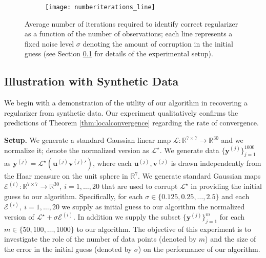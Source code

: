 \documentclass[11pt,letterpaper]{article}
\newcommand{\R}{\mathbb{R}}
\newcommand{\by}{\mathbf{y}}
\newcommand{\bu}{\mathbf{u}}
\newcommand{\bv}{\mathbf{v}}
\renewcommand{\L}{\mathcal{L}}
\begin{document}
\begin{figure}
	\centering
	\begin{subfigure}{.5\textwidth}
		\centering
		\texttt{[image: numberiterations\_line]}
		\label{fig:numberiterations_graph}
	\end{subfigure}
	\caption{Average number of iterations required to identify correct regularizer as a function of the number of observations; each line represents a fixed noise level $\sigma$ denoting the amount of corruption in the initial guess (see Section \ref{sec:numexp_synthetic} for details of the experimental setup).}
	\label{fig:numberiterations}
\end{figure}

\subsection{Illustration with Synthetic Data} \label{sec:numexp_synthetic}
We begin with a demonstration of the utility of our algorithm in recovering a regularizer from synthetic data.  Our experiment qualitatively confirms the predictions of Theorem \ref{thm:localconvergence} regarding the rate of convergence.

\textbf{Setup.} We generate a standard Gaussian linear map $\L : \R^{7 \times 7} \rightarrow \R^{30}$ and we normalize it; denote the normalized version as $\L^\star$.  We generate data $\{\by^{(j)}\}_{j=1}^{1000}$ as $\by^{(j)} = \L^\star(\bu^{(j)} {\bv^{(j)}}')$, where each $\bu^{(j)}, \bv^{(j)}$ is drawn independently from the Haar measure on the unit sphere in $\R^{7}$.  We generate standard Gaussian maps $\mathcal{E}^{(i)} : \R^{7 \times 7} \rightarrow \R^{30}, ~ i=1,\dots,20$ that are used to corrupt $\L^\star$ in providing the initial guess to our algorithm.  Specifically, for each $\sigma \in \{0.125, 0.25, \dots, 2.5\}$ and each $\mathcal{E}^{(i)}, ~ i=1,\dots,20$ we supply as initial guess to our algorithm the normalized version of $\L^\star + \sigma \mathcal{E}^{(i)}$.  In addition we supply the subset $\{\by^{(j)}\}_{j=1}^m$ for each $m \in \{50, 100, \dots, 1000\}$ to our algorithm.  The objective of this experiment is to investigate the role of the number of data points (denoted by $m$) and the size of the error in the initial guess (denoted by $\sigma$) on the performance of our algorithm.
\end{document}
